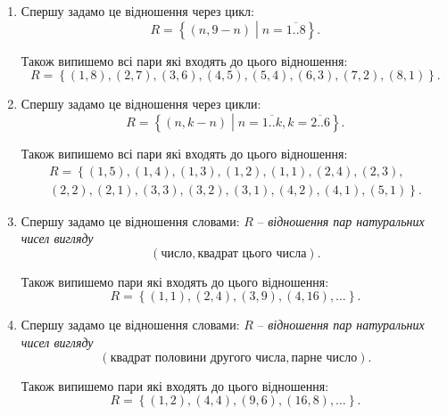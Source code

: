 \begin{solution}
	\nothing
	\begin{enumerate}
		\item Спершу задамо це відношення через цикл: \[R = \left\{ \left( n, 9 - n \right) \middle| n = \overline{1..8} \right\}.\] 

		Також випишемо всі пари які входять до цього відношення: \[ R = \left\{ \left( 1, 8 \right), \left( 2, 7 \right), \left( 3, 6 \right), \left( 4, 5 \right), \left( 5, 4 \right), \left( 6, 3 \right), \left( 7, 2 \right), \left( 8, 1 \right) \right\}. \]

		\item Спершу задамо це відношення через цикли: \[R = \left\{ \left( n, k - n \right) \middle| n = \overline{1..k}, k = \overline{2..6} \right\}.\]

		Також випишемо всі пари які входять до цього відношення: \begin{multline*} R = \left\{ \left( 1, 5 \right), \left( 1, 4 \right), \left( 1, 3 \right), \left( 1, 2 \right), \left( 1, 1 \right), \left( 2, 4 \right), \left( 2, 3 \right), \right. \\ \left. \left( 2, 2 \right), \left( 2, 1 \right), \left( 3, 3 \right), \left( 3, 2 \right), \left( 3, 1 \right), \left( 4, 2 \right), \left( 4, 1 \right), \left( 5, 1 \right) \right\}. \end{multline*}
		
		\item Спершу задамо це відношення словами: $R$ -- \emph{відношення пар натуральних чисел вигляду} \[ \left( \text{число}, \text{квадрат цього числа} \right). \]

		Також випишемо пари які входять до цього відношення: \[ R = \left\{ \left( 1, 1 \right), \left( 2, 4 \right), \left( 3, 9 \right), \left( 4, 16 \right), \ldots \right\}. \]
		
		\item Спершу задамо це відношення словами: $R$ -- \emph{відношення пар натуральних чисел вигляду} \[ \left( \text{квадрат половини другого числа}, \text{парне число} \right). \]

		Також випишемо пари які входять до цього відношення: \[ R = \left\{ \left( 1, 2 \right), \left( 4, 4 \right), \left(9 , 6 \right), \left(16 , 8 \right), \ldots \right\}. \]
		
	\end{enumerate}
\end{solution}

\newpage

